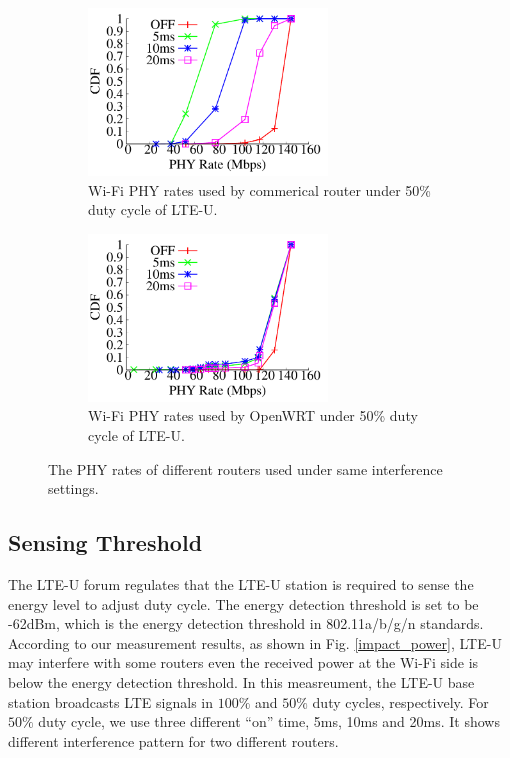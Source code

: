 \begin{figure}[t] \centering
    \begin{subfigure}[b]{\linewidth} \centering
     \includegraphics[width=2.5in, angle=0]{./figures/impact_ratecdf_tplink} 
         \vspace{-0.0cm}
         \caption{Wi-Fi PHY rates used by commerical router under 50\% duty cycle of LTE-U.}         
        \label{impact_cdfrate:a}
    \end{subfigure} %

    \begin{subfigure}[b]{\linewidth} \centering 
     \includegraphics[width=2.5in, angle=0]{./figures/impact_ratecdf_openwrt}  
        \vspace{-0.0cm}
        \caption{Wi-Fi PHY rates used by OpenWRT under 50\% duty cycle of LTE-U.}
        \label{impact_cdfrate:b}    
    \end{subfigure} 
\caption{The PHY rates of different routers used under same interference settings.}
\label{impact_cdfrate}
\vspace{-0.2cm}
\end{figure}




\subsection{Sensing Threshold}


The LTE-U forum regulates that the LTE-U station is required to sense the energy level
to adjust duty cycle. 
The energy detection threshold is set to be -62dBm, 
which is the energy detection threshold in 802.11a/b/g/n standards. 
According to our measurement results, as shown in Fig. \ref{impact_power},
LTE-U may interfere with some routers even the 
received power at the Wi-Fi side is below the energy detection threshold.
In this measreument, 
the LTE-U base station broadcasts LTE signals in $100\%$ and $50\%$ duty cycles, respectively. 
For $50\%$ duty cycle, we use three different ``on'' time, 5ms, 10ms and 20ms.
It shows different interference pattern for two different routers. 



